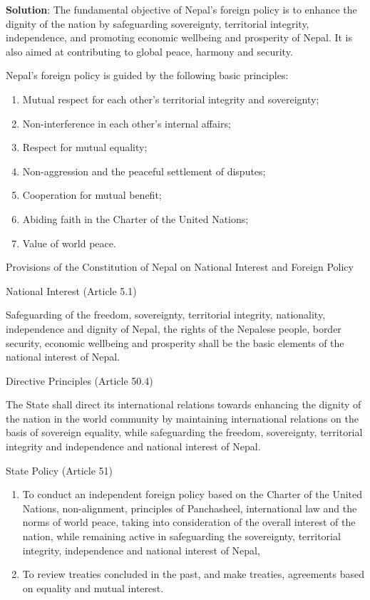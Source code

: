 \documentclass[
  openany]{book}
\newenvironment{solution}{ {\bfseries Solution}:}{}
\begin{document}
\begin{questions}
\begin{solution}
The fundamental objective of Nepal's foreign policy is to enhance the dignity of the nation by safeguarding sovereignty, territorial integrity, independence, and promoting economic wellbeing and prosperity of Nepal. It is also aimed at contributing to global peace, harmony and security.

Nepal's foreign policy is guided by the following basic principles:

\begin{enumerate}
\item Mutual respect for each other’s territorial integrity and sovereignty;
\item Non-interference in each other’s internal affairs;
\item Respect for mutual equality;
\item Non-aggression and the peaceful settlement of disputes;
\item Cooperation for mutual benefit;
\item Abiding faith in the Charter of the United Nations;
\item Value of world peace.
\end{enumerate}

Provisions of the Constitution of Nepal on National Interest and Foreign Policy

National Interest (Article 5.1)

Safeguarding of the freedom, sovereignty, territorial integrity, nationality, independence and dignity of Nepal, the rights of the Nepalese people, border security, economic wellbeing and prosperity shall be the basic elements of the national interest of Nepal.

Directive Principles (Article 50.4)

The State shall direct its international relations towards enhancing the dignity of the nation in the world community by maintaining international relations on the basis of sovereign equality, while safeguarding the freedom, sovereignty, territorial integrity and independence and national interest of Nepal.

State Policy (Article 51)

\begin{enumerate}
\item To conduct an independent foreign policy based on the Charter of the United Nations, non-alignment, principles of Panchasheel, international law and the norms of world peace, taking into consideration of the overall interest of the nation, while remaining active in safeguarding the sovereignty, territorial integrity, independence and national interest of Nepal,
\item To review treaties concluded in the past, and make treaties, agreements based on equality and mutual interest.
\end{enumerate}


\end{solution}
\end{questions}
\end{document}
